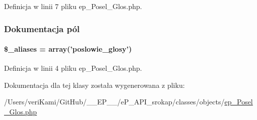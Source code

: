 Definicja w linii 7 pliku ep\-\_\-\-Posel\-\_\-\-Glos.\-php.



\subsubsection{Dokumentacja pól}
\hypertarget{classep___posel___glos_ab4e31d75f0bc5d512456911e5d01366b}{
\paragraph[{\$\-\_\-aliases}]{\setlength{\rightskip}{0pt plus 5cm}\$\-\_\-aliases = array('poslowie\-\_\-glosy')}}\label{classep___posel___glos_ab4e31d75f0bc5d512456911e5d01366b}


Definicja w linii 4 pliku ep\-\_\-\-Posel\-\_\-\-Glos.\-php.



Dokumentacja dla tej klasy została wygenerowana z pliku\-:\begin{DoxyCompactItemize}
\item 
/\-Users/veri\-Kami/\-Git\-Hub/\-\_\-\-\_\-\-E\-P\-\_\-\-\_\-/e\-P\-\_\-\-A\-P\-I\-\_\-srokap/classes/objects/\hyperlink{ep___posel___glos_8php}{ep\-\_\-\-Posel\-\_\-\-Glos.\-php}\end{DoxyCompactItemize}
